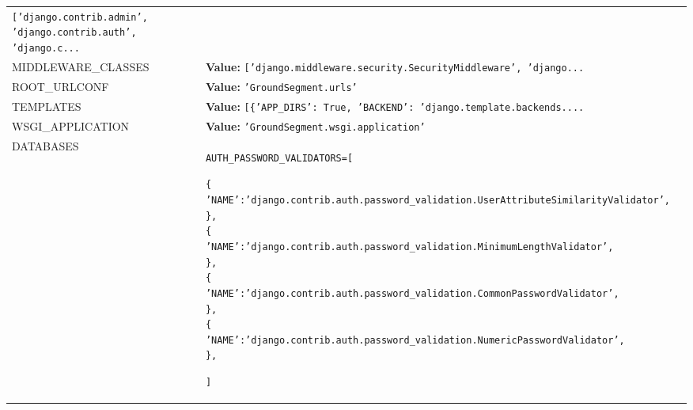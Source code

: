 \begin{longtable}{|p{\varnamewidth}|p{\vardescrwidth}|l}
{\tt \texttt{[}\texttt{'}\texttt{django.contrib.admin}\texttt{'}\texttt{, }\texttt{'}\texttt{django.contrib.auth}\texttt{'}\texttt{, }\texttt{'}\texttt{django.c}\texttt{...}}&\\
\cline{1-2}
\raggedright M\-I\-D\-D\-L\-E\-W\-A\-R\-E\-\_\-C\-L\-A\-S\-S\-E\-S\- & \raggedright \textbf{Value:} 
{\tt \texttt{[}\texttt{'}\texttt{django.middleware.security.SecurityMiddleware}\texttt{'}\texttt{, }\texttt{'}\texttt{django}\texttt{...}}&\\
\cline{1-2}
\raggedright R\-O\-O\-T\-\_\-U\-R\-L\-C\-O\-N\-F\- & \raggedright \textbf{Value:} 
{\tt \texttt{'}\texttt{GroundSegment.urls}\texttt{'}}&\\
\cline{1-2}
\raggedright T\-E\-M\-P\-L\-A\-T\-E\-S\- & \raggedright \textbf{Value:} 
{\tt \texttt{[}\texttt{\{}\texttt{'}\texttt{APP\_DIRS}\texttt{'}\texttt{: }True\texttt{, }\texttt{'}\texttt{BACKEND}\texttt{'}\texttt{: }\texttt{'}\texttt{django.template.backends.}\texttt{...}}&\\
\cline{1-2}
\raggedright W\-S\-G\-I\-\_\-A\-P\-P\-L\-I\-C\-A\-T\-I\-O\-N\- & \raggedright \textbf{Value:} 
{\tt \texttt{'}\texttt{GroundSegment.wsgi.application}\texttt{'}}&\\
\cline{1-2}
\raggedright D\-A\-T\-A\-B\-A\-S\-E\-S\- & \raggedright \begin{alltt}

AUTH\_PASSWORD\_VALIDATORS = [
    
    \{
        'NAME': 'django.contrib.auth.password\_validation.UserAttributeSimilarityValidator',
    \},
    \{
        'NAME': 'django.contrib.auth.password\_validation.MinimumLengthValidator',
    \},
    \{
        'NAME': 'django.contrib.auth.password\_validation.CommonPasswordValidator',
    \},
    \{
        'NAME': 'django.contrib.auth.password\_validation.NumericPasswordValidator',
    \},
    
    
]
\end{alltt}


\end{longtable}
